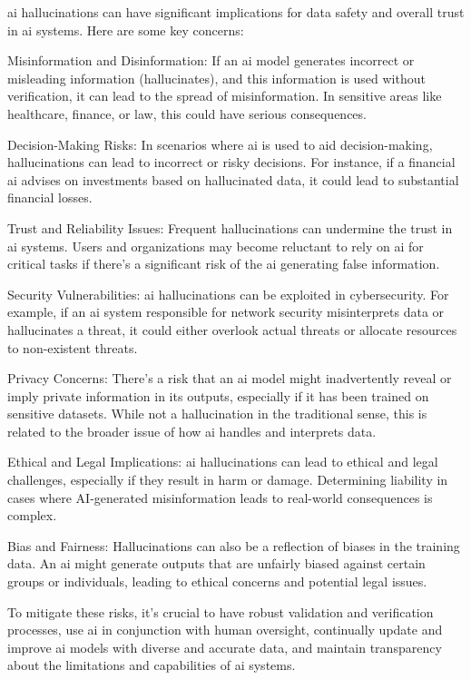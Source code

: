 \begin{aibox}%
  \Gls{ai} hallucinations can have significant implications for data safety and overall trust in \gls{ai} systems. Here are some key concerns:

Misinformation and Disinformation: If an \gls{ai} model generates incorrect or misleading information (hallucinates), and this information is used without verification, it can lead to the spread of misinformation. In sensitive areas like healthcare, finance, or law, this could have serious consequences.

Decision-Making Risks: In scenarios where \gls{ai} is used to aid decision-making, hallucinations can lead to incorrect or risky decisions. For instance, if a financial \gls{ai} advises on investments based on hallucinated data, it could lead to substantial financial losses.

Trust and Reliability Issues: Frequent hallucinations can undermine the trust in \gls{ai} systems. Users and organizations may become reluctant to rely on \gls{ai} for critical tasks if there's a significant risk of the \gls{ai} generating false information.

Security Vulnerabilities: \gls{ai} hallucinations can be exploited in cybersecurity. For example, if an \gls{ai} system responsible for network security misinterprets data or hallucinates a threat, it could either overlook actual threats or allocate resources to non-existent threats.

Privacy Concerns: There’s a risk that an \gls{ai} model might inadvertently reveal or imply private information in its outputs, especially if it has been trained on sensitive datasets. While not a hallucination in the traditional sense, this is related to the broader issue of how \gls{ai} handles and interprets data.

Ethical and Legal Implications: \gls{ai} hallucinations can lead to ethical and legal challenges, especially if they result in harm or damage. Determining liability in cases where AI-generated misinformation leads to real-world consequences is complex.

Bias and Fairness: Hallucinations can also be a reflection of biases in the training data. An \gls{ai} might generate outputs that are unfairly biased against certain groups or individuals, leading to ethical concerns and potential legal issues.

To mitigate these risks, it's crucial to have robust validation and verification processes, use \gls{ai} in conjunction with human oversight, continually update and improve \gls{ai} models with diverse and accurate data, and maintain transparency about the limitations and capabilities of \gls{ai} systems.
\end{aibox}

